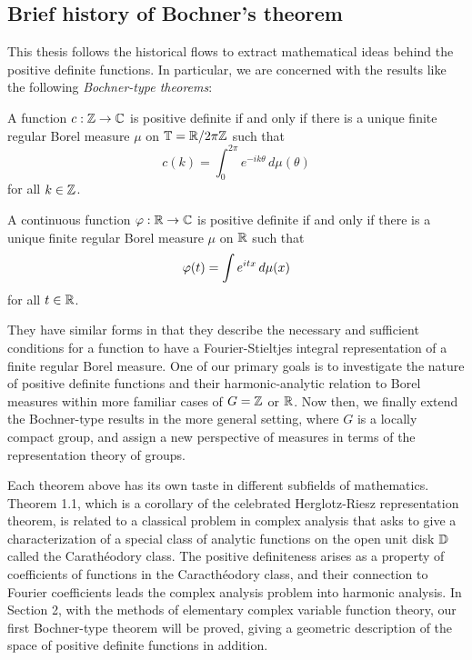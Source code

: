 \documentclass[12pt]{article}
\begin{document}
\begin{ex}

\end{ex}


\subsection{Brief history of Bochner's theorem}

This thesis follows the historical flows to extract mathematical ideas behind the positive definite functions.
In particular, we are concerned with the results like the following \emph{Bochner-type theorems}:
\begin{thm}
A function $c:\mathbb{Z}\to\mathbb{C}$ is positive definite if and only if there is a unique finite regular Borel measure $\mu$ on $\mathbb{T}=\mathbb{R}/2\pi\mathbb{Z}$ such that
\[c(k)=\int_0^{2\pi}e^{-ik\theta}\,d\mu(\theta)\]
for all $k\in\mathbb{Z}$.
\end{thm}
\begin{thm}
A continuous function $\varphi:\mathbb{R}\to\mathbb{C}$ is positive definite if and only if there is a unique finite regular Borel measure $\mu$ on $\mathbb{R}$ such that
\[\varphi(t)=\int e^{itx}\,d\mu(x)\]
for all $t\in\mathbb{R}$.
\end{thm}
They have similar forms in that they describe the necessary and sufficient conditions for a function to have a Fourier-Stieltjes integral representation of a finite regular Borel measure.
One of our primary goals is to investigate the nature of positive definite functions and their harmonic-analytic relation to Borel measures within more familiar cases of $G=\mathbb{Z}$ or $\mathbb{R}$.
Now then, we finally extend the Bochner-type results in the more general setting, where $G$ is a locally compact group, and assign a new perspective of measures in terms of the representation theory of groups.

Each theorem above has its own taste in different subfields of mathematics.
Theorem 1.1, which is a corollary of the celebrated Herglotz-Riesz representation theorem, is related to a classical problem in complex analysis that asks to give a characterization of a special class of analytic functions on the open unit disk $\mathbb{D}$ called the Carath\'eodory class.
The positive definiteness arises as a property of coefficients of functions in the Caracth\'eodory class, and their connection to Fourier coefficients leads the complex analysis problem into harmonic analysis.
In Section 2, with the methods of elementary complex variable function theory, our first Bochner-type theorem will be proved, giving a geometric description of the space of positive definite functions in addition.
\end{document}
